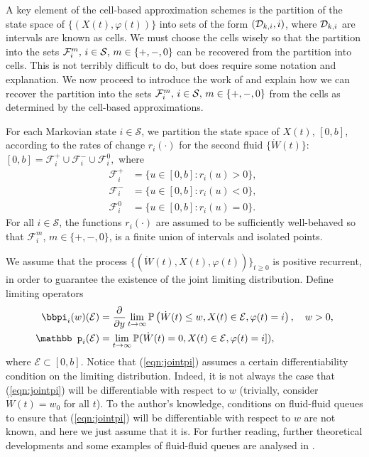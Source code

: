 A key element of the cell-based approximation schemes is the partition of the state space of \(\{(X(t),\varphi(t))\}\) into sets of the form \((\mathcal{D}_{k,i},i)\), where \(\mathcal{D}_{k,i}\) are intervals are known as cells. We must choose the cells wisely so that the partition into the sets \(\mathcal F_i^m,\, i\in\mathcal{S},\,m\in\{+,-,0\}\) can be recovered from the partition into cells. This is not terribly difficult to do, but does require some notation and explanation. We now proceed to introduce the work of \cite{bo2014} and explain how we can recover the partition into the sets \(\mathcal F_i^m,\, i\in\mathcal{S},\,m\in\{+,-,0\}\) from the cells as determined by the cell-based approximations.

For each Markovian state $i \in \mathcal{S}$, we partition the state space of \( X(t)\), \([0,b]\), according to the rates of change $r_i(\cdot)$ for the second fluid $\{\dot W(t)\}$: $[0,b] = \mathcal{F}^{+}_i \cup \mathcal{F}^{-}_i \cup \mathcal{F}^{0}_i,$  
where 
% 
		\begin{align} 
			\mathcal{F}^{+}_i & = \{u \in [0,b] : r_i(u) > 0\},  \; \nonumber
			\\\mathcal{F}^{-}_i &=  \{u \in [0,b]:  r_i(u) < 0\}, \; \nonumber
			\\\mathcal{F}^{0}_i &= \{u \in [0,b]: r_i(u) = 0\}.\label{eqn:fil}
		\end{align} 
% 
For all $i \in \mathcal{S}$, the functions $r_i(\cdot)$ are assumed to be sufficiently well-behaved so that $\mathcal{F}^{m}_i$, $m \in \{+, -, 0\}$, is a finite union of intervals and isolated points. 

We assume that the process $\{(\dot W(t), X(t), \varphi(t))\}_{t\geq 0}$ is positive recurrent, in order to guarantee the existence of the joint limiting distribution. Define limiting operators 
\begin{align} 
		\label{eqn:jointpi} 
		\bbpi_i(w)(\mathcal{E}) & =  \frac{\partial}{\partial y} \lim_{t \rightarrow \infty} \mathbb{P}\left( \dot W(t) \leq w,  X(t) \in \mathcal{E}, \varphi(t) = i\right), \quad w>0,\\
% 
		\label{eqn:jointmass}
		{\mathbb p}_i(\mathcal{E}) & = \lim_{t \rightarrow \infty}  \mathbb{P}( \dot W(t) = 0,  X(t) \in \mathcal{E}, \varphi(t) = i]),
\end{align} 
where $\mathcal{E} \subset [0,b]$. Notice that (\ref{eqn:jointpi}) assumes a certain differentiability condition on the limiting distribution. Indeed, it is not always the case that (\ref{eqn:jointpi}) will be differentiable with respect to \(w\) (trivially, consider \(\dot W(t)=w_0\) for all \(t\)). To the author's knowledge, conditions on fluid-fluid queues to ensure that (\ref{eqn:jointpi}) will be differentiable with respect to \(w\) are not known, and here we just assume that it is. For further reading, further theoretical developments and some examples of fluid-fluid queues are analysed in \cite{boz2022}. 

